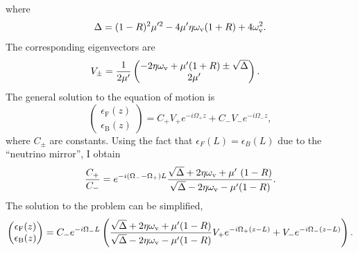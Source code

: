 where
\begin{equation}
   \Delta = (1-R)^2 \mu'^2  - 4\mu' \eta\omega_\mathrm v (1+R) + 4\omega_\mathrm v^2.
\end{equation}
The corresponding eigenvectors are
\begin{align}
   V_\pm &= \frac{1}{2\mu'}\begin{pmatrix}
   { -2\eta\omega_\mathrm v+  \mu' (1+R) \pm \sqrt{\Delta} } \\
   2\mu'
   \end{pmatrix}.
\end{align}
The general solution to the equation of motion is
\begin{equation*}
   \begin{pmatrix}
   \epsilon_{\mathrm F}(z) \\
   \epsilon_{\mathrm B}(z)
   \end{pmatrix} = C_+ V_+ e^{-i \Omega_+ z} +  C_- V_- e^{-i \Omega_- z},
\end{equation*}
where $C_\pm$ are constants. Using the fact that $\epsilon_F(L)=\epsilon_B(L)$ due to the ``neutrino mirror'', I obtain
\begin{equation}
   \frac{C_+}{C_-} = e^{-i(\Omega_- -\Omega_+)L} \frac{ \sqrt{\Delta} +  2\eta\omega_\mathrm v + \mu' \ (1-R) }{\sqrt{\Delta} -  2\eta\omega_\mathrm v - \mu' (1-R)}.
\end{equation}
The solution to the problem can be simplified,
\begin{equation}
   \begin{pmatrix}
   \epsilon_{\mathrm F}(z) \\
   \epsilon_{\mathrm B}(z)
   \end{pmatrix} = C_- e^{-i\Omega_- L} \left( \frac{ \sqrt{\Delta} +  2\eta\omega_\mathrm v + \mu'  (1-R) }{\sqrt{\Delta} -  2\eta\omega_\mathrm v - \mu' (1-R)} V_+ e^{-i \Omega_+ (z-L)} +  V_- e^{-i \Omega_- (z-L)} \right).
\end{equation}

